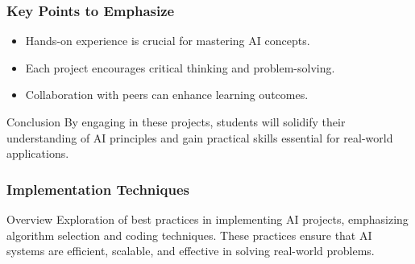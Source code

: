 \documentclass[aspectratio=169]{beamer}
\begin{document}
\begin{frame}[fragile]
    \frametitle{Key Points to Emphasize}
    \begin{itemize}
        \item Hands-on experience is crucial for mastering AI concepts.
        \item Each project encourages critical thinking and problem-solving.
        \item Collaboration with peers can enhance learning outcomes.
    \end{itemize}
    
    \begin{block}{Conclusion}
        By engaging in these projects, students will solidify their understanding of AI principles and gain practical skills essential for real-world applications.
    \end{block}
\end{frame}

\begin{frame}
    \frametitle{Implementation Techniques}
    \begin{block}{Overview}
        Exploration of best practices in implementing AI projects, emphasizing algorithm selection and coding techniques. These practices ensure that AI systems are efficient, scalable, and effective in solving real-world problems.
    \end{block}
\end{frame}
\end{document}

